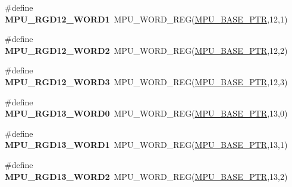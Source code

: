 \begin{DoxyCompactItemize}
\item 
\hypertarget{group___m_p_u___register___accessor___macros_ga0ee0fc6358b5eabff695be9b4eb02ae6}{}\#define {\bfseries M\+P\+U\+\_\+\+R\+G\+D12\+\_\+\+W\+O\+R\+D1}~M\+P\+U\+\_\+\+W\+O\+R\+D\+\_\+\+R\+E\+G(\hyperlink{group___m_p_u___peripheral_gae2d60f80178d84225d77e5f0214d1f1d}{M\+P\+U\+\_\+\+B\+A\+S\+E\+\_\+\+P\+T\+R},12,1)\label{group___m_p_u___register___accessor___macros_ga0ee0fc6358b5eabff695be9b4eb02ae6}

\item 
\hypertarget{group___m_p_u___register___accessor___macros_gae2e52dc9a78aa86bdbf2541b769471bf}{}\#define {\bfseries M\+P\+U\+\_\+\+R\+G\+D12\+\_\+\+W\+O\+R\+D2}~M\+P\+U\+\_\+\+W\+O\+R\+D\+\_\+\+R\+E\+G(\hyperlink{group___m_p_u___peripheral_gae2d60f80178d84225d77e5f0214d1f1d}{M\+P\+U\+\_\+\+B\+A\+S\+E\+\_\+\+P\+T\+R},12,2)\label{group___m_p_u___register___accessor___macros_gae2e52dc9a78aa86bdbf2541b769471bf}

\item 
\hypertarget{group___m_p_u___register___accessor___macros_ga773f75538bfb6d33b6fcb9ef0c823947}{}\#define {\bfseries M\+P\+U\+\_\+\+R\+G\+D12\+\_\+\+W\+O\+R\+D3}~M\+P\+U\+\_\+\+W\+O\+R\+D\+\_\+\+R\+E\+G(\hyperlink{group___m_p_u___peripheral_gae2d60f80178d84225d77e5f0214d1f1d}{M\+P\+U\+\_\+\+B\+A\+S\+E\+\_\+\+P\+T\+R},12,3)\label{group___m_p_u___register___accessor___macros_ga773f75538bfb6d33b6fcb9ef0c823947}

\item 
\hypertarget{group___m_p_u___register___accessor___macros_gae3e49b0523ad572b4f70aa49914267d7}{}\#define {\bfseries M\+P\+U\+\_\+\+R\+G\+D13\+\_\+\+W\+O\+R\+D0}~M\+P\+U\+\_\+\+W\+O\+R\+D\+\_\+\+R\+E\+G(\hyperlink{group___m_p_u___peripheral_gae2d60f80178d84225d77e5f0214d1f1d}{M\+P\+U\+\_\+\+B\+A\+S\+E\+\_\+\+P\+T\+R},13,0)\label{group___m_p_u___register___accessor___macros_gae3e49b0523ad572b4f70aa49914267d7}

\item 
\hypertarget{group___m_p_u___register___accessor___macros_gad8189042e72c1f0e5ccab04259081a8f}{}\#define {\bfseries M\+P\+U\+\_\+\+R\+G\+D13\+\_\+\+W\+O\+R\+D1}~M\+P\+U\+\_\+\+W\+O\+R\+D\+\_\+\+R\+E\+G(\hyperlink{group___m_p_u___peripheral_gae2d60f80178d84225d77e5f0214d1f1d}{M\+P\+U\+\_\+\+B\+A\+S\+E\+\_\+\+P\+T\+R},13,1)\label{group___m_p_u___register___accessor___macros_gad8189042e72c1f0e5ccab04259081a8f}

\item 
\hypertarget{group___m_p_u___register___accessor___macros_ga87d3d0264cacec4254fa7fbe47feb1a0}{}\#define {\bfseries M\+P\+U\+\_\+\+R\+G\+D13\+\_\+\+W\+O\+R\+D2}~M\+P\+U\+\_\+\+W\+O\+R\+D\+\_\+\+R\+E\+G(\hyperlink{group___m_p_u___peripheral_gae2d60f80178d84225d77e5f0214d1f1d}{M\+P\+U\+\_\+\+B\+A\+S\+E\+\_\+\+P\+T\+R},13,2)\label{group___m_p_u___register___accessor___macros_ga87d3d0264cacec4254fa7fbe47feb1a0}


\end{DoxyCompactItemize}
